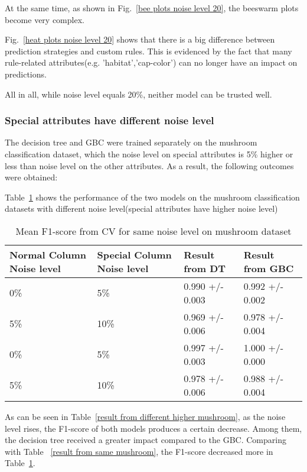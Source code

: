 \documentclass[runningheads,a4paper]{llncs}
\begin{document}
At the same time, as shown in Fig.~\ref{bee plots noise level 20}, the beeswarm plots become very complex.

Fig.~\ref{heat plots noise level 20} shows that there is a big difference between prediction strategies and custom rules.
This is evidenced by the fact that many rule-related attributes(e.g. 'habitat','cap-color') can no longer have an impact on predictions.

All in all, while noise level equals 20\%, neither model can be trusted well.

\subsubsection{Special attributes have different noise level}
The decision tree and GBC were trained separately on the mushroom classification dataset, which the noise level on special attributes is 5\% higher or less than noise level on the other attributes. As a result, the following outcomes were obtained:

Table~\ref{result from spcial different mushroom} shows the performance of the two models on the mushroom classification datasets with different noise level(special attributes have higher noise level)

\begin{table}[H]
	\centering
	\caption{Mean F1-score from CV for same noise level on mushroom dataset}
	\label{result from spcial different mushroom}
	\begin{tabular}{|l|l|l|l|}
		\hline
		Normal Column Noise level&Special Column Noise level & Result from DT  &Result from GBC\\
		\hline
		0\%& 5\%& 0.990 +/- 0.003 & 0.992 +/- 0.002 \\
		5\%& 10\%& 0.969 +/- 0.006 & 0.978 +/- 0.004 \\
		\hline
		0\%& 5\%& 0.997 +/- 0.003 & 1.000 +/- 0.000 \\
		5\%& 10\%& 0.978 +/- 0.006 & 0.988 +/- 0.004 \\
		\hline
	\end{tabular}
\end{table}

As can be seen in Table~\ref{result from different higher mushroom}, as the noise level rises, the F1-score of both models produces a certain decrease. Among them, the decision tree received a greater impact compared to the GBC. Comparing with Table ~\ref{result from same mushroom}, the F1-score decreased more in Table~\ref{result from spcial different mushroom}.
\end{document}
